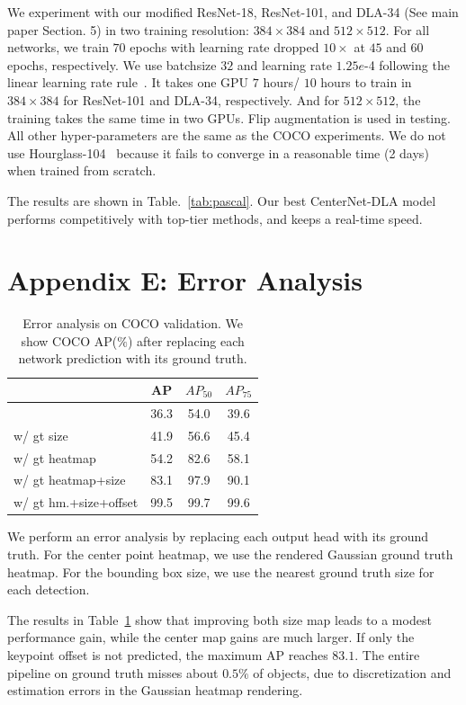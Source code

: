 \documentclass[10pt,twocolumn,letterpaper]{article}
\begin{document}
We experiment with our modified ResNet-18, ResNet-101, and DLA-34 (See main paper Section. 5) in two training resolution: $384 \times 384$ and $512 \times 512$.
For all networks, we train $70$ epochs with learning rate dropped $10 \times$ at $45$ and $60$ epochs, respectively.
We use batchsize $32$ and learning rate $1.25e$-4 following the linear learning rate rule~\cite{goyal2017accurate}.
It takes one GPU $7$ hours/ $10$ hours to train in $384 \times 384$ for ResNet-101 and DLA-34, respectively.
And for $512 \times 512$, the training takes the same time in two GPUs.
Flip augmentation is used in testing.
All other hyper-parameters are the same as the COCO experiments.
We do not use Hourglass-104~\cite{Law_2018_ECCV} because it fails to converge in a reasonable time (2 days) when trained from scratch.

The results are shown in Table.~\ref{tab:pascal}.
Our best CenterNet-DLA model performs competitively with top-tier methods, and keeps a real-time speed.


\section*{Appendix E: Error Analysis}

\begin{table}
\centering
\begin{tabular}{l c c c}
\hline
 & AP & $AP_{50}$ & $AP_{75}$ \\
\hline
          & 36.3 & 54.0 & 39.6 \\
w/ gt size & 41.9 & 56.6 & 45.4 \\
w/ gt heatmap & 54.2 & 82.6 & 58.1 \\
w/ gt heatmap+size & 83.1 & 97.9 & 90.1 \\
w/ gt hm.+size+offset & 99.5 & 99.7 & 99.6 \\
\hline
\end{tabular}
\caption{Error analysis on COCO validation. We show COCO AP($\%$) after replacing each network prediction with its ground truth.}
\label{tab:gt}
\end{table}

We perform an error analysis by replacing each output head with its ground truth.
For the center point heatmap, we use the rendered Gaussian ground truth heatmap.
For the bounding box size, we use the nearest ground truth size for each detection.

The results in Table~\ref{tab:gt} show that improving both size map leads to a modest performance gain, while the center map gains are much larger.
If only the keypoint offset is not predicted, the maximum AP reaches $83.1$.
The entire pipeline on ground truth misses about $0.5\%$ of objects, due to discretization and estimation errors in the Gaussian heatmap rendering.
\end{document}
